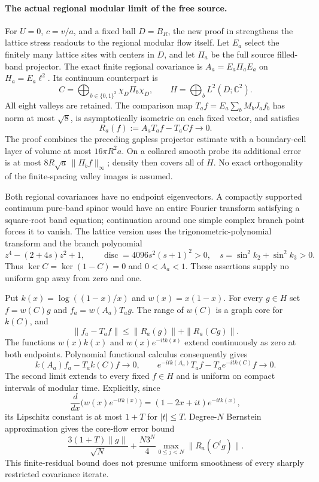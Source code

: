 \paragraph{The actual regional modular limit of the free source.}
For $U=0$, $c=v/a$, and a fixed ball $D=B_R$, the new proof in
 strengthens the lattice stress
readouts to the regional modular flow itself. Let $E_a$ select the finitely
many lattice sites with centers in $D$, and let $\Pi_a$ be the full source
filled-band projector. The exact finite regional covariance is
$A_a=E_a\Pi_aE_a$ on $H_a=E_a\ell^2$. Its continuum counterpart is
\[
 C=\bigoplus_{b\in\{0,1\}^3}\chi_D\Pi_b\chi_D,
 \qquad H=\bigoplus_b L^2(D;\mathbb C^2).
\]
All eight valleys are retained. The comparison map
$T_af=E_a\sum_bM_bJ_af_b$ has norm at most $\sqrt8$, is asymptotically
isometric on each fixed vector, and satisfies
\[
 R_a(f):=A_aT_af-T_aCf\longrightarrow0.
\]
The proof combines the preceding gapless projector estimate with a
boundary-cell layer of volume at most $16\pi R^2a$. On a collared smooth
probe its additional error is at most
$8R\sqrt a\,\|\Pi_bf\|_\infty$; density then covers all of $H$.
No exact orthogonality of the finite-spacing valley images is assumed.

Both regional covariances have no endpoint eigenvectors. A compactly
supported continuum pure-band spinor would have an entire Fourier
transform satisfying a square-root band equation; continuation around
one simple complex branch point forces it to vanish. The lattice version
uses the trigonometric-polynomial transform and the branch polynomial
\[
 z^4-(2+4s)z^2+1,\qquad
 \operatorname{disc}=4096s^2(s+1)^2>0,
 \quad s=\sin^2k_2+\sin^2k_3>0.
\]
Thus $\ker C=\ker(1-C)=0$ and $0<A_a<1$. These assertions supply no
uniform gap away from zero and one.

Put $k(x)=\log((1-x)/x)$ and $w(x)=x(1-x)$. For every $g\in H$ set
$f=w(C)g$ and $f_a=w(A_a)T_ag$. The range of $w(C)$ is a graph core for
$k(C)$, and
\[
 \|f_a-T_af\|\leq\|R_a(g)\|+\|R_a(Cg)\|.
\]
The functions $w(x)k(x)$ and $w(x)e^{-itk(x)}$ extend continuously as
zero at both endpoints. Polynomial functional calculus consequently gives
\[
 k(A_a)f_a-T_ak(C)f\longrightarrow0,
 \qquad e^{-itk(A_a)}T_af-T_ae^{-itk(C)}f\longrightarrow0.
\]
The second limit extends to every fixed $f\in H$ and is uniform on
compact intervals of modular time. Explicitly, since
\[
 \frac{d}{dx}\bigl(w(x)e^{-itk(x)}\bigr)
   =(1-2x+it)e^{-itk(x)},
\]
its Lipschitz constant is at most $1+T$ for $|t|\leq T$. Degree-$N$
Bernstein approximation gives the core-flow error bound
\[
 \frac{3(1+T)\|g\|}{\sqrt N}
 +\frac{N3^N}{4}\max_{0\leq j<N}\|R_a(C^jg)\|.
\]
This finite-residual bound does not presume uniform smoothness of every
sharply restricted covariance iterate.

